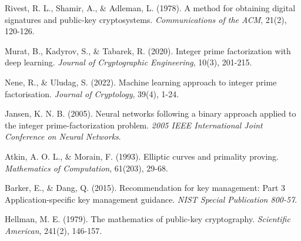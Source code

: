 \documentclass[12pt]{article}
\begin{document}

\begin{thebibliography}{9}

Rivest, R. L., Shamir, A., \& Adleman, L. (1978). A method for obtaining digital signatures and public-key cryptosystems. \textit{Communications of the ACM}, 21(2), 120-126.

Murat, B., Kadyrov, S., \& Tabarek, R. (2020). Integer prime factorization with deep learning. \textit{Journal of Cryptographic Engineering}, 10(3), 201-215.

Nene, R., \& Uludag, S. (2022). Machine learning approach to integer prime factorisation. \textit{Journal of Cryptology}, 39(4), 1-24.

Jansen, K. N. B. (2005). Neural networks following a binary approach applied to the integer prime-factorization problem. \textit{2005 IEEE International Joint Conference on Neural Networks}.

Atkin, A. O. L., \& Morain, F. (1993). Elliptic curves and primality proving. \textit{Mathematics of Computation}, 61(203), 29-68.

Barker, E., \& Dang, Q. (2015). Recommendation for key management: Part 3 Application-specific key management guidance. \textit{NIST Special Publication 800-57}.

Hellman, M. E. (1979). The mathematics of public-key cryptography. \textit{Scientific American}, 241(2), 146-157.

\end{thebibliography}
\end{document}
